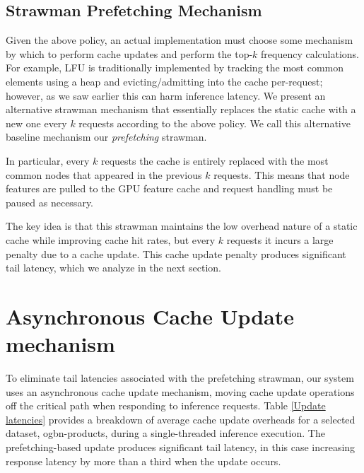 

\subsection{Strawman Prefetching Mechanism}
Given the above policy, an actual implementation must choose some mechanism by which to perform cache updates and perform the top-$k$ frequency calculations. For example, LFU is traditionally implemented by tracking the most common elements using a heap and evicting/admitting into the cache per-request; however, as we saw earlier this can harm inference latency. We present an alternative strawman mechanism that essentially replaces the static cache with a new one every $k$ requests according to the above policy. We call this alternative baseline mechanism our \textit{prefetching} strawman. 

In particular, every $k$ requests the cache is entirely replaced with the most common nodes that appeared in the previous $k$ requests. This means that node features are pulled to the GPU feature cache and request handling must be paused as necessary. 

The key idea is that this strawman maintains the low overhead nature of a static cache while improving cache hit rates, but every $k$ requests it incurs a large penalty due to a cache update. This cache update penalty produces significant tail latency, which we analyze in the next section.

\section{Asynchronous Cache Update mechanism} \label{Design: Async Update}
 
To eliminate tail latencies associated with the prefetching strawman, our system uses an asynchronous cache update mechanism, moving cache update operations off the critical path when responding to inference requests.
Table \ref{Update latencies} provides a breakdown of average cache update overheads for a selected dataset, ogbn-products, during a single-threaded inference execution. The prefetching-based update produces significant tail latency, in this case increasing response latency by more than a third when the update occurs.

